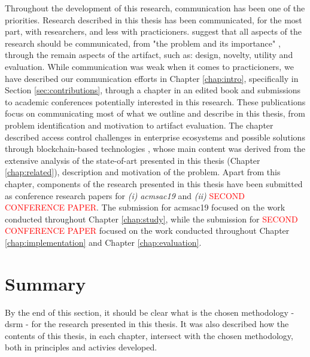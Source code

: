Throughout the development of this research, communication has been one of the priorities. Research described in this thesis has been communicated, for the most part, with researchers, and less with practicioners. \citeauthor{peffers_design_2007} suggest that all aspects of the research should be communicated, from "the problem and its importance" \cite[14]{peffers_design_2007}, through the remain aspects of the artifact, such as: design, novelty, utility and evaluation. While communication was weak when it comes to practicioners, we have described our communication efforts in Chapter \ref{chap:intro}, specifically in Section \ref{sec:contributions}, through a chapter in an edited book \cite{bryan_christiansen_access_2018} and submissions to academic conferences potentially interested in this research. These publications focus on communicating most of what we outline and describe in this thesis, from problem identification and motivation to artifact evaluation. The chapter described access control challenges in enterprise ecosystems and possible solutions through blockchain-based technologies \cite{bryan_christiansen_access_2018}, whose main content was derived from the extensive analysis of the state-of-art presented in this thesis (Chapter \ref{chap:related}), description and motivation of the problem. Apart from this chapter, components of the research presented in this thesis have been submitted as conference research papers for \emph{(i)} \textit{\gls{acmsac19}} and \emph{(ii)} \textcolor{red}{SECOND CONFERENCE PAPER}. The submission for \gls{acmsac19} focused on the work conducted throughout Chapter \ref{chap:study}, while the submission for \textcolor{red}{SECOND CONFERENCE PAPER} focused on the work conducted throughout Chapter \ref{chap:implementation} and Chapter \ref{chap:evaluation}.

\section{Summary}

By the end of this section, it should be clear what is the chosen methodology - \glsdesc{dsrm} - for the research presented in this thesis. It was also described how the contents of this thesis, in each chapter, intersect with the chosen methodology, both in principles and activies developed.